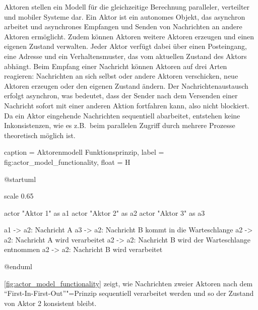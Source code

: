 Aktoren stellen ein Modell für die gleichzeitige Berechnung paralleler, verteilter und mobiler Systeme dar.
Ein Aktor ist ein autonomes Objekt, das asynchron arbeitet und asynchrones Empfangen und Senden von Nachrichten an andere Aktoren ermöglicht.
Zudem können Aktoren weitere Aktoren erzeugen und einen eigenen Zustand verwalten.
Jeder Aktor verfügt dabei über einen Posteingang, eine Adresse und ein Verhaltensmuster, das vom aktuellen Zustand des Aktors abhängt.
Beim Empfang einer Nachricht können Aktoren auf drei Arten reagieren:
Nachrichten an sich selbst oder andere Aktoren verschicken, neue Aktoren erzeugen oder den eigenen Zustand ändern.
Der Nachrichtenaustausch erfolgt asynchron, was bedeutet, dass der Sender nach dem Versenden einer Nachricht sofort mit einer anderen Aktion fortfahren kann, also nicht blockiert.
Da ein Aktor eingehende Nachrichten sequentiell abarbeitet, entstehen keine Inkonsistenzen, wie es z.B.\ beim parallelen Zugriff durch mehrere Prozesse theoretisch möglich ist.

\begin{dhbwfigure}{%
    caption	= Aktorenmodell Funktionsprinzip,
    label	= fig:actor_model_functionality,
    float   = H
}
\begin{plantuml}
@startuml

scale 0.65

actor "Aktor 1" as a1
actor "Aktor 2" as a2
actor "Aktor 3" as a3

a1 -> a2: Nachricht A
a3 -> a2: Nachricht B kommt in die Warteschlange
a2 -> a2: Nachricht A wird verarbeitet
a2 -> a2: Nachricht B wird der Warteschlange entnommen
a2 -> a2: Nachricht B wird verarbeitet

@enduml
\end{plantuml}
\end{dhbwfigure}

\autoref{fig:actor_model_functionality} zeigt, wie Nachrichten zweier Aktoren nach dem \enquote{First-In-First-Out}"=Prinzip sequentiell verarbeitet werden und so der Zustand von Aktor 2 konsistent bleibt.
